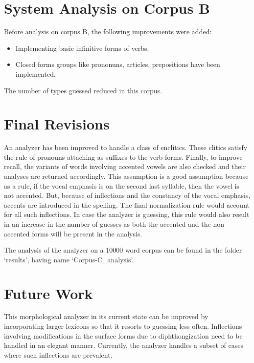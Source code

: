 \documentclass[11pt,letterpaper]{article}
\begin{document}
\section{System Analysis on Corpus B}

Before analysis on corpus B, the following improvements were added:
\begin{itemize}
\item Implementing basic infinitive forms of verbs.
\item Closed forms groups like prononuns, articles, prepositions have been implemented.
\end{itemize}
The number of types guessed reduced in this corpus.

\section{Final Revisions}
An analyzer has been improved to handle a class of enclitics. These clitics satisfy the rule of pronouns attaching as suffixes to the verb forms. Finally, to improve recall, the variants of words involving accented vowels are also checked and their analyses are returned accordingly. This assumption is a good assumption because as a rule, if the vocal emphasis is on the second last syllable, then the vowel is not accented. But, because of inflections and the constancy of the vocal emphasis, accents are introduced in the spelling. The final normalization rule would account for all such inflections. In case the analyzer is guessing, this rule would also result in an increase in the number of guesses as both the accented and the non accented forms will be present in the analysis.

The analysis of the analyzer on a 10000 word corpus can be found in the folder `results', having name `Corpus-C\_analysis'.

\section{Future Work}
This morphological analyzer in its current state can be improved by incorporating larger lexicons so that it resorts to guessing less often. Inflections involving modifications in the surface forms due to diphthongization need to be handled in an elegant manner. Currently, the analyzer handles a subset of cases where such inflections are prevalent.







\label{lastpage}
\end{document}
